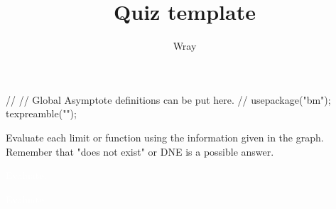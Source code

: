 \documentclass[addpoints, 12pt]{exam}
\title{Quiz template}
\author{Wray}
\begin{document}
\begin{asydef}
//
// Global Asymptote definitions can be put here.
//
usepackage("bm");
texpreamble("\def\V#1{\bm{#1}}");
\end{asydef}



\bigskip

             
\bigskip
\bigskip

\smallskip
Evaluate each limit or function using the information given in the graph.  Remember that "does not exist" or DNE is a possible answer.

\begin{questions}

\question[5]
\textcolor{white}{Evaluate.}

\begin{minipage}{0.45\textwidth}
\end{minipage} \hfill
\begin{minipage}{0.5\textwidth}
\end{minipage} 


\question[5]
\textcolor{white}{Evaluate.}

\begin{minipage}{0.45\textwidth}
\end{minipage} \hfill
\begin{minipage}{0.5\textwidth}
\begin{parts}

\end{parts}
\end{minipage}
\end{questions}
\end{document}
